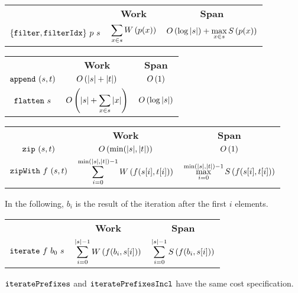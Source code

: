 \begin{costspec}[Filter]

\begin{tabular}{c|c|c}
& \textbf{Work} & \textbf{Span} \\
%
$\{\texttt{filter},\texttt{filterIdx}\}~p~s$ &
$\displaystyle \sum_{x \in s} W\left({p(x)}\right)$ &
$\displaystyle O\left({\log{|s|}}\right) + \max_{x \in s} S\left({p(x)}\right)$ \\
%
\end{tabular}
\end{costspec}

\begin{costspec}[Concatenation]

\begin{tabular}{c|c|c}
& \textbf{Work} & \textbf{Span} \\
%
$\texttt{append}~(s,t)$ &
$\displaystyle O\left({|s| + |t|}\right)$ &
$\displaystyle O\left({1}\right)$ \\
%
$\texttt{flatten}~s$ &
$\displaystyle O\left({|s| + \sum_{x \in s} |x|}\right)$ &
$\displaystyle O\left({\log{|s|}}\right)$
%
\end{tabular}
\end{costspec}

\begin{costspec}[Zip]

\begin{tabular}{c|c|c}
& \textbf{Work} & \textbf{Span} \\
%
$\texttt{zip}~(s,t)$ &
$\displaystyle O\left({\min(|s|,|t|)}\right)$ &
$\displaystyle O\left({1}\right)$ \\
%
$\texttt{zipWith}~f~(s,t)$ &
$\displaystyle \sum_{i = 0}^{\min(|s|,|t|)-1} W\left({f(s[i],t[i])}\right)$ &
$\displaystyle \max_{i = 0}^{\min(|s|,|t|)-1} S\left({f(s[i],t[i])}\right)$
%
\end{tabular}
\end{costspec}

\begin{flex}

\begin{costspec}[Iteration]
In the following, $b_i$ is the result of the iteration after the first $i$
elements.
\begin{tabular}{c|c|c}
& \textbf{Work} & \textbf{Span} \\
%
$\texttt{iterate}~f~b_0~s$ &
$\displaystyle \sum_{i = 0}^{|s|-1} W\left({f(b_i, s[i])}\right)$ &
$\displaystyle \sum_{i = 0}^{|s|-1} S\left({f(b_i, s[i])}\right)$
\end{tabular}
\end{costspec}

\begin{note}
$\texttt{iteratePrefixes}$ and $\texttt{iteratePrefixesIncl}$ have the same cost
specification.
\end{note}

\end{flex}

